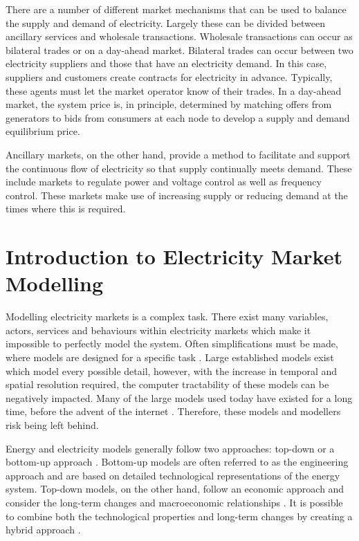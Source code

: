 There are a number of different market mechanisms that can be used to balance the supply and demand of electricity. Largely these can be divided between ancillary services and wholesale transactions. Wholesale transactions can occur as bilateral trades or on a day-ahead market. Bilateral trades can occur between two electricity suppliers and those that have an electricity demand. In this case, suppliers and customers create contracts for electricity in advance. Typically, these agents must let the market operator know of their trades. In a day-ahead market, the system price is, in principle, determined by matching offers from generators to bids from consumers at each node to develop a supply and demand equilibrium price. 

Ancillary markets, on the other hand, provide a method to facilitate and support the continuous flow of electricity so that supply continually meets demand. These include markets to regulate power and voltage control as well as frequency control. These markets make use of increasing supply or reducing demand at the times where this is required. 







\section{Introduction to Electricity Market Modelling}
\label{sec:intro:elecmarketsmodelling}

Modelling electricity markets is a complex task. There exist many variables, actors, services and behaviours within electricity markets which make it impossible to perfectly model the system. Often simplifications must be made, where models are designed for a specific task \cite{Pfenninger2014a}. Large established models exist which model every possible detail, however, with the increase in temporal and spatial resolution required, the computer tractability of these models can be negatively impacted. Many of the large models used today have existed for a long time, before the advent of the internet \cite{Pfenninger2014a}. Therefore, these models and modellers risk being left behind.

Energy and electricity models generally follow two approaches: top-down or a bottom-up approach \cite{Ringkjob2018}. Bottom-up models are often referred to as the engineering approach and are based on detailed technological representations of the energy system. Top-down models, on the other hand, follow an economic approach and consider the long-term changes and macroeconomic relationships \cite{Mai2013}. It is possible to combine both the technological properties and long-term changes by creating a hybrid approach \cite{Fortes2014}.

